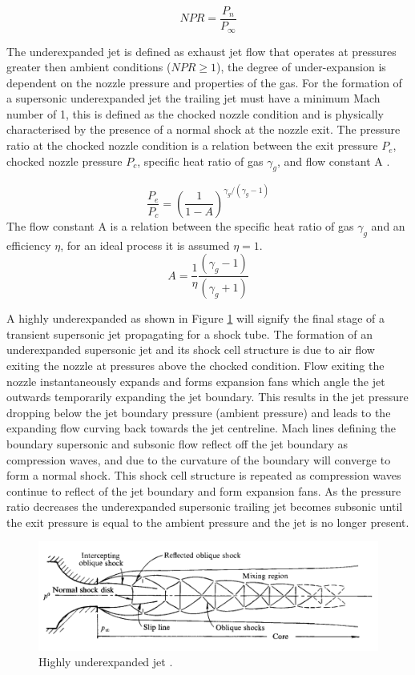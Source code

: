 \begin{equation}
NPR = \frac{P_n}{P_{\infty}}
\end{equation}

The underexpanded jet is defined as exhaust jet flow that operates at pressures greater then ambient conditions ($NPR\geq 1$), the degree of under-expansion is dependent on the nozzle pressure and properties of the gas. For the formation of a supersonic underexpanded jet the trailing jet must have a minimum Mach number of 1, this is defined as the chocked nozzle condition and is physically characterised by the presence of a normal shock  at the nozzle exit. The pressure ratio at the chocked nozzle condition is a relation between the exit pressure $P_e$, chocked nozzle pressure $P_c$, specific heat ratio of gas $\gamma_g$, and flow constant A \citep{anderson2010fundamentals}.

\begin{equation}
\frac{P_e}{P_c} = \left(\frac{1}{1-A}\right)^{\gamma_g/(\gamma_g-1)}
\end{equation}
The flow constant A is a relation between the specific heat ratio of gas $\gamma_g$ and an efficiency $\eta$, for an ideal process it is assumed $\eta=1$.
\begin{equation}
A=\frac{1}{\eta}\frac{(\gamma_g-1)}{(\gamma_g+1)}
\end{equation}

A highly underexpanded as shown in Figure \ref{fig:jet} will signify the final stage of a transient supersonic jet propagating for a shock tube. The formation of an underexpanded supersonic jet and its shock cell structure is due to air flow exiting the nozzle at pressures above the chocked condition. Flow exiting the nozzle instantaneously expands and forms expansion fans which angle the jet outwards temporarily expanding the jet boundary. This results in the jet pressure dropping below the jet boundary pressure (ambient pressure) and leads to the expanding flow curving back towards the jet centreline. Mach lines defining the boundary supersonic and subsonic flow reflect off the jet boundary as compression waves, and due to the curvature of the boundary will converge to form a normal shock. This shock cell structure is repeated as compression waves continue to reflect of the jet boundary and form expansion fans. As the pressure ratio decreases the underexpanded supersonic trailing jet becomes subsonic until the exit pressure is equal to the ambient pressure and the jet is no longer present.

\begin{figure}[H] 
	\centering
	\includegraphics[width=1\textwidth]{jet.png} 
	\caption{Highly underexpanded jet \citep{snedeker1971study}.}
	\label{fig:jet}
\end{figure}


